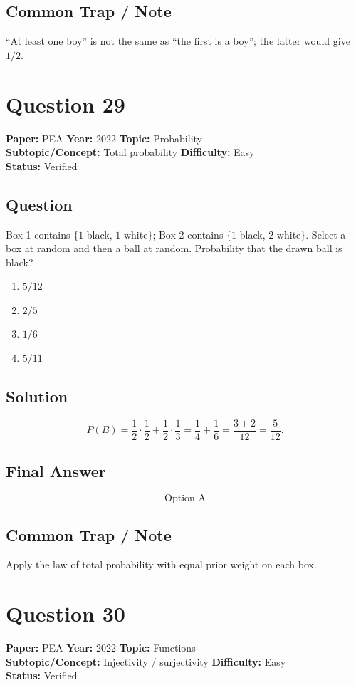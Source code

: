 \documentclass[11pt]{article}
\begin{document}
\subsection*{Common Trap / Note}
``At least one boy'' is not the same as ``the first is a boy''; the latter would give $1/2$.

\section*{Question 29}
\textbf{Paper:} PEA \quad \textbf{Year:} 2022 \quad \textbf{Topic:} Probability \\
\textbf{Subtopic/Concept:} Total probability \quad \textbf{Difficulty:} Easy \\
\textbf{Status:} Verified

\subsection*{Question}
Box 1 contains $\{1$ black, $1$ white$\}$; Box 2 contains $\{1$ black, $2$ white$\}$. Select a
box at random and then a ball at random. Probability that the drawn ball is black?
\begin{enumerate}[label=(\Alph*)]
\item $5/12$
\item $2/5$
\item $1/6$
\item $5/11$
\end{enumerate}

\subsection*{Solution}
\[
P(B) = \frac{1}{2}\cdot\frac{1}{2} + \frac{1}{2}\cdot\frac{1}{3}
= \frac{1}{4} + \frac{1}{6} = \frac{3 + 2}{12} = \frac{5}{12}.
\]

\subsection*{Final Answer}
\[
\boxed{\text{Option A}}
\]

\subsection*{Common Trap / Note}
Apply the law of total probability with equal prior weight on each box.

\section*{Question 30}
\textbf{Paper:} PEA \quad \textbf{Year:} 2022 \quad \textbf{Topic:} Functions \\
\textbf{Subtopic/Concept:} Injectivity / surjectivity \quad \textbf{Difficulty:} Easy \\
\textbf{Status:} Verified
\end{document}
